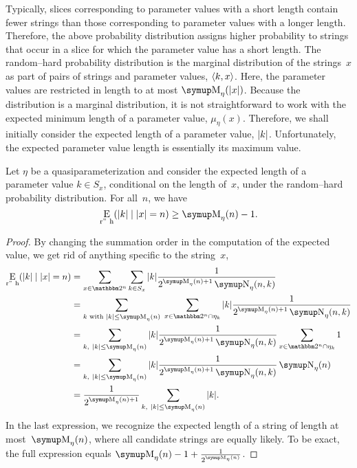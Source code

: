 Typically, slices corresponding to parameter values with a short length contain fewer strings than those corresponding to parameter values with a longer length.
Therefore, the above probability distribution assigns higher probability to strings that occur in a slice for which the parameter value has a short length.
The random--hard probability distribution is the marginal distribution of the strings~$x$ as part of pairs of strings and parameter values, ${\langle k, x\rangle}$.
Here, the parameter values are restricted in length to at most $\upM_\eta(\length{x})$.
Because the distribution is a marginal distribution, it is not straightforward to work with the expected minimum length of a parameter value, $\mu_\eta(x)$.
Therefore, we shall initially consider the expected length of a parameter value, ${\lvert k\rvert}$.
Unfortunately, the expected parameter value length is essentially its maximum value.
\begin{theorem}
\label{thm:expected_randomhard}%
  Let $\eta$ be a quasiparameterization and consider the expected length of a parameter value $k \in S_x$, conditional on the length of~$x$, under the random--hard probability distribution.
  For all~$n$, we have
  \begin{equation*}
    \Ex_\mathrm{r"~h}(\length{k} \given \length{x} = n) \ge \upM_\eta(n) - 1.
  \end{equation*}
\end{theorem}
\begin{proof}
  By changing the summation order in the computation of the expected value, we get rid of anything specific to the string~$x$,
  \begin{align*}
    \Ex_\mathrm{r"~h}(\length{k} \given \length{x} = n)
      &= \sum_{x \in \binary^n} \sum_{k \in S_x} \length{k} \frac{1}{2^{\upM_\eta(n) + 1} \upN_\eta(n, k)} \\
      &= \sum_{k\text{ with }\length{k} \le \upM_\eta(n)}\;\sum_{x \in \binary^n \cap \eta_k} \length{k} \frac{1}{2^{\upM_\eta(n) + 1} \upN_\eta(n, k)} \\
      &= \sum_{k,\ \length{k} \le \upM_\eta(n)} \length{k} \frac{1}{2^{\upM_\eta(n) + 1} \upN_\eta(n, k)} \sum_{x \in \binary^n \cap \eta_k} 1 \\
      &= \sum_{k,\ \length{k} \le \upM_\eta(n)} \length{k} \frac{1}{2^{\upM_\eta(n) + 1} \upN_\eta(n, k)} \upN_\eta(n) \\
      &= \frac{1}{2^{\upM_\eta(n) + 1}} \sum_{k,\ \length{k} \le \upM_\eta(n)} \length{k}.
  \end{align*}
  In the last expression, we recognize the expected length of a string of length at most~$\upM_\eta(n)$, where all candidate strings are equally likely.
  To be exact, the full expression equals $\upM_\eta(n) - 1 + \frac{1}{2^{\upM_\eta(n)}}$.
\end{proof}

